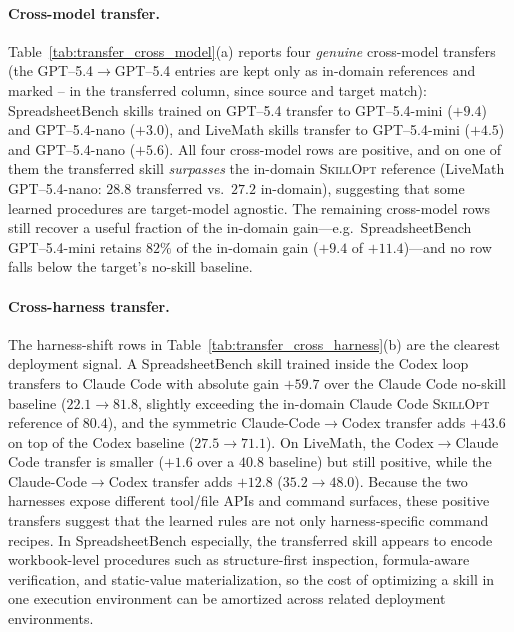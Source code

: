 \documentclass{llmxive}
\providecommand{\ourmethod}{\textsc{SkillOpt}\xspace}
\providecommand{\na}{--}
\begin{document}
\paragraph{Cross-model transfer.}
Table~\ref{tab:transfer_cross_model}(a) reports four \emph{genuine} cross-model transfers (the GPT--5.4{$\to$}GPT--5.4 entries are kept only as in-domain references and marked \na{} in the transferred column, since source and target match): SpreadsheetBench skills trained on GPT--5.4 transfer to GPT--5.4-mini ($+9.4$) and GPT--5.4-nano ($+3.0$), and LiveMath skills transfer to GPT--5.4-mini ($+4.5$) and GPT--5.4-nano ($+5.6$). All four cross-model rows are positive, and on one of them the transferred skill \emph{surpasses} the in-domain \ourmethod{} reference (LiveMath GPT--5.4-nano: $28.8$ transferred vs.\ $27.2$ in-domain), suggesting that some learned procedures are target-model agnostic. The remaining cross-model rows still recover a useful fraction of the in-domain gain---e.g.\ SpreadsheetBench GPT--5.4-mini retains $82\%$ of the in-domain gain ($+9.4$ of $+11.4$)---and no row falls below the target's no-skill baseline.

\paragraph{Cross-harness transfer.}
The harness-shift rows in Table~\ref{tab:transfer_cross_harness}(b) are the clearest deployment signal. A SpreadsheetBench skill trained inside the Codex loop transfers to Claude Code with absolute gain $+59.7$ over the Claude Code no-skill baseline ($22.1{\to}81.8$, slightly exceeding the in-domain Claude Code \ourmethod{} reference of $80.4$), and the symmetric Claude-Code$\to$Codex transfer adds $+43.6$ on top of the Codex baseline ($27.5{\to}71.1$). On LiveMath, the Codex$\to$Claude Code transfer is smaller ($+1.6$ over a $40.8$ baseline) but still positive, while the Claude-Code$\to$Codex transfer adds $+12.8$ ($35.2{\to}48.0$). Because the two harnesses expose different tool/file APIs and command surfaces, these positive transfers suggest that the learned rules are not only harness-specific command recipes. In SpreadsheetBench especially, the transferred skill appears to encode workbook-level procedures such as structure-first inspection, formula-aware verification, and static-value materialization, so the cost of optimizing a skill in one execution environment can be amortized across related deployment environments.
\end{document}

